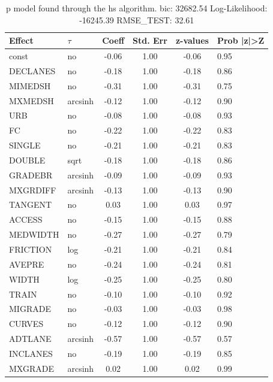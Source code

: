 \begin{table}
	\caption{p model found through the hs algorithm. bic: 32682.54 Log-Likelihood: -16245.39 RMSE_TEST: 32.61}
	\begin{center}
		\begin{tabular}{|l|l|c|c|c|l|}
			\hline
			Effect & $\tau$ & Coeff & Std. Err & z-values & Prob |z|>Z \\
			\hline
			const & no & -0.06 & 1.00 & -0.06 & 0.95 \\
			\hline
			DECLANES & no & -0.18 & 1.00 & -0.18 & 0.86 \\
			\hline
			MIMEDSH & no & -0.31 & 1.00 & -0.31 & 0.75 \\
			\hline
			MXMEDSH & arcsinh & -0.12 & 1.00 & -0.12 & 0.90 \\
			\hline
			URB & no & -0.08 & 1.00 & -0.08 & 0.93 \\
			\hline
			FC & no & -0.22 & 1.00 & -0.22 & 0.83 \\
			\hline
			SINGLE & no & -0.21 & 1.00 & -0.21 & 0.83 \\
			\hline
			DOUBLE & sqrt & -0.18 & 1.00 & -0.18 & 0.86 \\
			\hline
			GRADEBR & arcsinh & -0.09 & 1.00 & -0.09 & 0.93 \\
			\hline
			MXGRDIFF & arcsinh & -0.13 & 1.00 & -0.13 & 0.90 \\
			\hline
			TANGENT & no & 0.03 & 1.00 & 0.03 & 0.97 \\
			\hline
			ACCESS & no & -0.15 & 1.00 & -0.15 & 0.88 \\
			\hline
			MEDWIDTH & no & -0.27 & 1.00 & -0.27 & 0.79 \\
			\hline
			FRICTION & log & -0.21 & 1.00 & -0.21 & 0.84 \\
			\hline
			AVEPRE & no & -0.24 & 1.00 & -0.24 & 0.81 \\
			\hline
			WIDTH & log & -0.25 & 1.00 & -0.25 & 0.80 \\
			\hline
			TRAIN & no & -0.10 & 1.00 & -0.10 & 0.92 \\
			\hline
			MIGRADE & no & -0.03 & 1.00 & -0.03 & 0.98 \\
			\hline
			CURVES & no & -0.12 & 1.00 & -0.12 & 0.90 \\
			\hline
			ADTLANE & arcsinh & -0.57 & 1.00 & -0.57 & 0.57 \\
			\hline
			INCLANES & no & -0.19 & 1.00 & -0.19 & 0.85 \\
			\hline
			MXGRADE & arcsinh & 0.02 & 1.00 & 0.02 & 0.99 \\
			\hline

\end{tabular}
\end{center}
\end{table}
